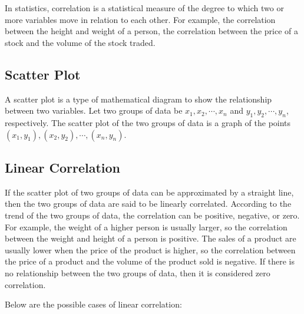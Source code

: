 \documentclass{report}
\begin{document}
\begin{multicols}{2}
  In statistics, correlation is a statistical measure of the degree to which two
  or more variables move in relation to each other. For example, the correlation
  between the height and weight of a person, the correlation between the price of
  a stock and the volume of the stock traded.

  \subsection*{Scatter Plot}

  A scatter plot is a type of mathematical diagram to show the relationship
  between two variables. Let two groups of data be $x_1, x_2, \cdots, x_n$ and
  $y_1, y_2, \cdots, y_n$, respectively. The scatter plot of the two groups of
  data is a graph of the points $(x_1, y_1), (x_2, y_2), \cdots, (x_n, y_n)$.

  \subsection*{Linear Correlation}

  If the scatter plot of two groups of data can be approximated by a straight
  line, then the two groups of data are said to be linearly correlated. According
  to the trend of the two groups of data, the correlation can be positive,
  negative, or zero. For example, the weight of a higher person is usually
  larger, so the correlation between the weight and height of a person is
  positive. The sales of a product are usually lower when the price of the
  product is higher, so the correlation between the price of a product and the
  volume of the product sold is negative. If there is no relationship between the
  two groups of data, then it is considered zero correlation.

  Below are the possible cases of linear correlation:


\end{multicols}
\end{document}
